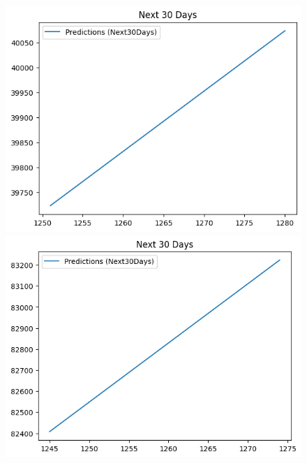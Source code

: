 \begin{figure}[H]
\begin{minipage}{0.15\textwidth}
    \end{minipage}
    \hfill
        \begin{minipage}{0.15\textwidth}
    \centering
    \includegraphics[width=1\textwidth]{resources/chapter-5/predicted/BIDV_LinearRegression_9-1 30 DAYS.png}
    \end{minipage}
    \hfill
    \begin{minipage}{0.15\textwidth}
    \centering
    \includegraphics[width=1\textwidth]{resources/chapter-5/predicted/VCB_LinearRegression_7-3 30 DAYS.png}
    \end{minipage}
    \hfill
    \begin{minipage}{0.15\textwidth}
    \centering

\end{minipage}
\end{figure}
